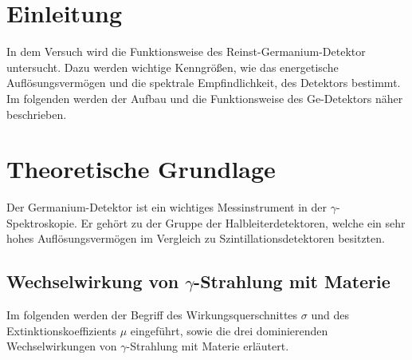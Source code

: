 \section{Einleitung}
In dem Versuch wird die Funktionsweise des Reinst-Germanium-Detektor untersucht. Dazu werden wichtige Kenngrößen, wie das energetische Auflösungsvermögen und die spektrale Empfindlichkeit, des Detektors bestimmt. Im folgenden werden der Aufbau und die Funktionsweise des Ge-Detektors näher beschrieben.



\section{Theoretische Grundlage}
\label{sec:Theorie}
Der Germanium-Detektor ist ein wichtiges Messinstrument in der $\gamma$-Spektroskopie. Er gehört zu der Gruppe der Halbleiterdetektoren, welche ein sehr hohes Auflösungsvermögen im Vergleich zu Szintillationsdetektoren besitzten.



\subsection{Wechselwirkung von \texorpdfstring{$\gamma$}{}-Strahlung mit Materie}
Im folgenden werden der Begriff des Wirkungsquerschnittes $\sigma$ und des Extinktionskoeffizients $\mu$ eingeführt, sowie die drei dominierenden Wechselwirkungen von $\gamma$-Strahlung mit Materie erläutert.



